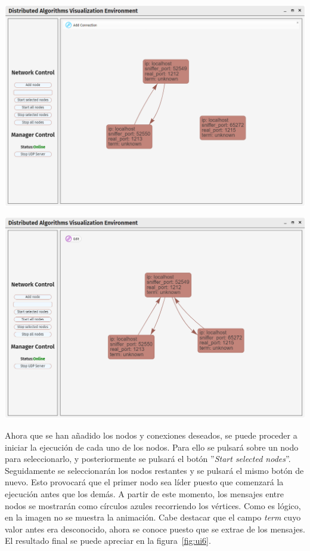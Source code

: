 {
\centering
\includegraphics[width=0.9\linewidth]{imagenes/ui4}
\label{fig:ui4}
}

{
\centering
\includegraphics[width=0.9\linewidth]{imagenes/ui5}
\label{fig:ui5}
}

\newpage

Ahora que se han añadido los nodos y conexiones deseados, se puede proceder a iniciar la ejecución de cada uno de los nodos. Para ello se pulsará sobre un nodo para seleccionarlo, y posteriormente se pulsará el botón ''\textit{Start selected nodes}''. Seguidamente se seleccionarán los nodos restantes y se pulsará el mismo botón de nuevo. Esto provocará que el primer nodo sea líder puesto que comenzará la ejecución antes que los demás. A partir de este momento, los mensajes entre nodos se mostrarán como círculos azules recorriendo los vértices. Como es lógico, en la imagen no se muestra la animación. Cabe destacar que el campo \textit{term} cuyo valor antes era desconocido, ahora se conoce puesto que se extrae de los mensajes. El resultado final se puede apreciar en la figura~\ref{fig:ui6}.


